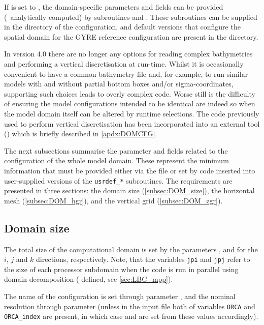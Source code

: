 \documentclass[../main/NEMO_manual]{subfiles}
\begin{document}
If  is set to ,
the domain-specific parameters and fields can be provided (\eg\ analytically computed) by
subroutines  and .
These subroutines can be supplied in the  directory of the configuration,
and default versions that configure the spatial domain for the GYRE reference configuration are
present in the  directory.

In version 4.0 there are no longer any options for reading complex bathymetries and
performing a vertical discretisation at run-time.
Whilst it is occasionally convenient to have a common bathymetry file and, for example,
to run similar models with and without partial bottom boxes and/or sigma-coordinates,
supporting such choices leads to overly complex code.
Worse still is the difficulty of ensuring the model configurations intended to be identical are
indeed so when the model domain itself can be altered by runtime selections.
The code previously used to perform vertical discretisation has been incorporated into
an external tool () which is briefly described in \autoref{apdx:DOMCFG}.

The next subsections summarise the parameter and fields related to
the configuration of the whole model domain.
These represent the minimum information that must be provided either via
the  file or
set by code inserted into user-supplied versions of the \texttt{usrdef\_*} subroutines.
The requirements are presented in three sections:
the domain size (\autoref{subsec:DOM_size}), the horizontal mesh (\autoref{subsec:DOM_hgr}),
and the vertical grid (\autoref{subsec:DOM_zgr}).

\subsection{Domain size}
\label{subsec:DOM_size}

The total size of the computational domain is set by the parameters ,  and
 for the $i$, $j$ and $k$ directions, respectively.
Note, that the variables \texttt{jpi} and \texttt{jpj} refer to
the size of each processor subdomain when the code is run in parallel using domain decomposition
( defined, see \autoref{sec:LBC_mpp}).

The name of the configuration is set through parameter ,
and the nominal resolution through parameter 
(unless in the input file both of variables \texttt{ORCA} and \texttt{ORCA\_index} are present,
in which case  and  are set from these values accordingly).
\end{document}
